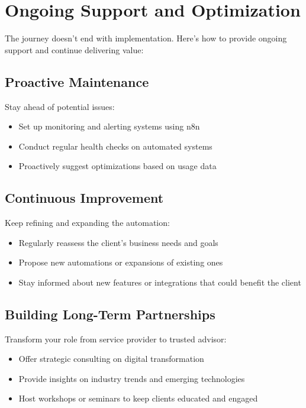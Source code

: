 \section{Ongoing Support and Optimization}

The journey doesn't end with implementation. Here's how to provide ongoing support and continue delivering value:

\subsection{Proactive Maintenance}

Stay ahead of potential issues:

\begin{itemize}
    \item Set up monitoring and alerting systems using n8n
    \item Conduct regular health checks on automated systems
    \item Proactively suggest optimizations based on usage data
\end{itemize}

\subsection{Continuous Improvement}

Keep refining and expanding the automation:

\begin{itemize}
    \item Regularly reassess the client's business needs and goals
    \item Propose new automations or expansions of existing ones
    \item Stay informed about new features or integrations that could benefit the client
\end{itemize}

\subsection{Building Long-Term Partnerships}

Transform your role from service provider to trusted advisor:

\begin{itemize}
    \item Offer strategic consulting on digital transformation
    \item Provide insights on industry trends and emerging technologies
    \item Host workshops or seminars to keep clients educated and engaged
\end{itemize}


